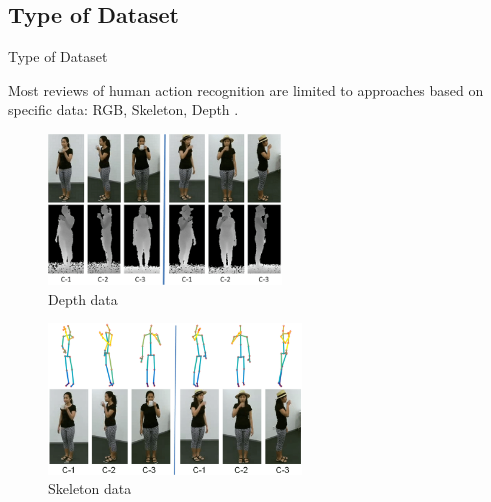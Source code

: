 \subsection{Type of Dataset}
\begin{frame}{Type of Dataset}

    Most reviews of human action recognition are limited to approaches based on specific data: RGB, Skeleton, Depth \cite{shahroudy2016ntu}.

    \begin{multicols}{2}
        \begin{figure}[htp]
            \centering
            \includegraphics[height=4cm]{topics/201010-zhang2019comprehensive/assets/img/depth_data_ex.png}
            \caption{Depth data}
            \label{fig:depth_data_ex}
        \end{figure}
        \begin{figure}[htp]
            \centering
            \includegraphics[height=4cm]{topics/201010-zhang2019comprehensive/assets/img/skeleton_data_ex.png}
            \caption{Skeleton data}
            \label{fig:skeleton_data_ex}
        \end{figure}
    \end{multicols}
\end{frame}